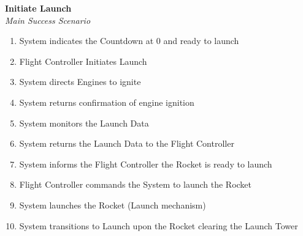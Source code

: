 \documentclass[letterpaper]{article}
\begin{document}
\noindent
\textbf{Initiate Launch}\\
\textit{Main Success Scenario}
\begin{enumerate}
\item System indicates the Countdown at 0 and ready to launch
\item Flight Controller Initiates Launch
\item System directs Engines to ignite
\item System returns confirmation of engine ignition
\item System monitors the Launch Data
\item System returns the Launch Data to the Flight Controller
\item System informs the Flight Controller the Rocket is ready to
launch
\item Flight Controller commands the System to launch the Rocket
\item System launches the Rocket (Launch mechanism)
\item System transitions to Launch upon the Rocket clearing the Launch
Tower
\end{enumerate}
\end{document}
